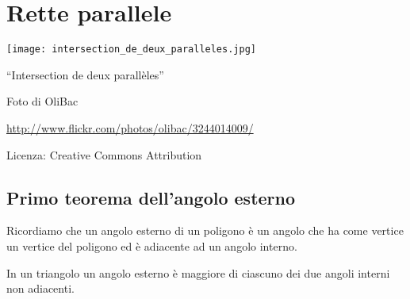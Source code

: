 \chapter{Rette parallele}

\texttt{[image: intersection\_de\_deux\_paralleles.jpg]}
  \begin{center}
    {\large ``Intersection de deux parallèles''}\par
    Foto di OliBac\par
    \url{http://www.flickr.com/photos/olibac/3244014009/}\par
    Licenza: Creative Commons Attribution\par
  \end{center}
\newpage

\section{Primo teorema dell'angolo esterno}

Ricordiamo che un angolo esterno di un poligono è un angolo che ha come vertice un vertice del poligono ed è adiacente ad un angolo interno.

\begin{teorema}
In un triangolo un angolo esterno è maggiore di ciascuno dei due angoli interni non adiacenti.
\end{teorema}


